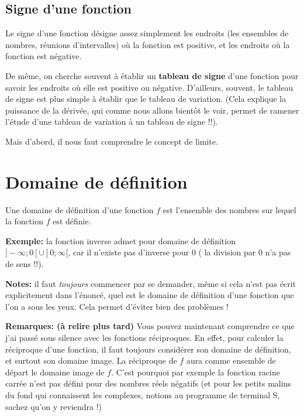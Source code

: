 \documentclass[french,]{article}
\begin{document}
\hypertarget{signe-dune-fonction}{%
\subsection{Signe d'une fonction}\label{signe-dune-fonction}}

Le signe d'une fonction désigne assez simplement les endroits (les
ensembles de nombres, réunions d'intervalles) où la fonction est
positive, et les endroits où la fonction est négative.

De même, on cherche souvent à établir un \textbf{tableau de signe} d'une
fonction pour savoir les endroits où elle est positive ou négative.
D'ailleurs, souvent, le tableau de signe est plus simple à établir que
le tableau de variation. (Cela explique la puissance de la dérivée, qui
comme nous allons bientôt le voir, permet de ramener l'étude d'une
tableau de variation à un tableau de signe !!).

Mais d'abord, il nous faut comprendre le concept de limite.

\hypertarget{domaine-de-duxe9finition}{%
\section{Domaine de définition}\label{domaine-de-duxe9finition}}

Une domaine de définition d'une fonction \(f\) est l'ensemble des
nombres sur lequel la fonction \(f\) est définie.

\textbf{Exemple:} la fonction inverse admet pour domaine de définition
\(] -\infty; 0[ \cup ]0; \infty[\), car il n'existe pas d'inverse pour 0
( la division par 0 n'a pas de sens !!).

\textbf{Notes:} il faut \emph{toujours} commencer par se demander, même
si cela n'est pas écrit explicitement dans l'énoncé, quel est le domaine
de définition d'une fonction que l'on a sous les yeux. Cela permet
d'éviter bien des problèmes !

\textbf{Remarques: (à relire plus tard)} Vous pouvez maintenant
comprendre ce que j'ai passé sous silence avec les fonctions
réciproques. En effet, pour calculer la réciproque d'une fonction, il
faut toujours considérer son domaine de définition, et surtout son
domaine image. La réciproque de \(f\) aura comme ensemble de départ le
domaine image de \(f\). C'est pourquoi par exemple la fonction racine
carrée n'est pas défini pour des nombres réels négatifs (et pour les
petits malins du fond qui connaissent les complexes, notions au
programme de terminal S, sachez qu'on y reviendra !)
\end{document}
